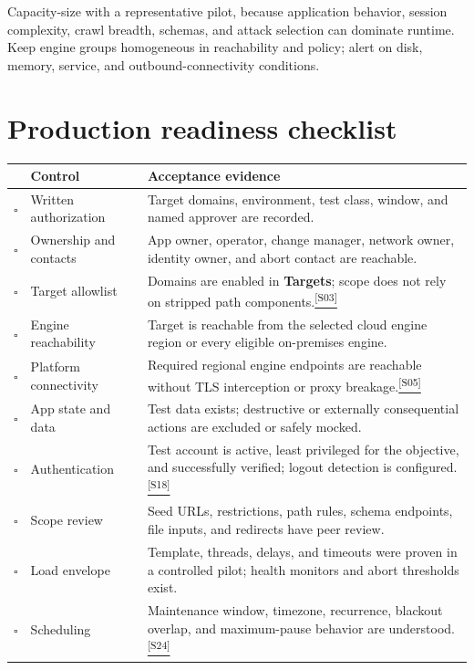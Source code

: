 \documentclass[11pt,letterpaper,oneside]{scrreprt}
\newcommand{\src}[1]{\hyperref[src:#1]{\textsuperscript{\color{R7Orange}[#1]}}}
\newcommand{\uipath}[1]{\textsf{\textbf{#1}}}
\begin{document}
\begin{oprec}
Capacity-size with a representative pilot, because application behavior, session complexity, crawl breadth, schemas, and attack selection can dominate runtime. Keep engine groups homogeneous in reachability and policy; alert on disk, memory, service, and outbound-connectivity conditions.
\end{oprec}

\section{Production readiness checklist}
\begin{longtable}{@{}P{0.28in}P{2.25in}P{3.95in}@{}}
\toprule
 & \textbf{Control} & \textbf{Acceptance evidence}\\
\midrule
\endhead
$\square$ & Written authorization & Target domains, environment, test class, window, and named approver are recorded.\\
$\square$ & Ownership and contacts & App owner, operator, change manager, network owner, identity owner, and abort contact are reachable.\\
$\square$ & Target allowlist & Domains are enabled in \uipath{Targets}; scope does not rely on stripped path components.\src{S03}\\
$\square$ & Engine reachability & Target is reachable from the selected cloud engine region or every eligible on-premises engine.\\
$\square$ & Platform connectivity & Required regional engine endpoints are reachable without TLS interception or proxy breakage.\src{S05}\\
$\square$ & App state and data & Test data exists; destructive or externally consequential actions are excluded or safely mocked.\\
$\square$ & Authentication & Test account is active, least privileged for the objective, and successfully verified; logout detection is configured.\src{S18}\\
$\square$ & Scope review & Seed URLs, restrictions, path rules, schema endpoints, file inputs, and redirects have peer review.\\
$\square$ & Load envelope & Template, threads, delays, and timeouts were proven in a controlled pilot; health monitors and abort thresholds exist.\\
$\square$ & Scheduling & Maintenance window, timezone, recurrence, blackout overlap, and maximum-pause behavior are understood.\src{S24}\\

\end{longtable}
\end{document}
